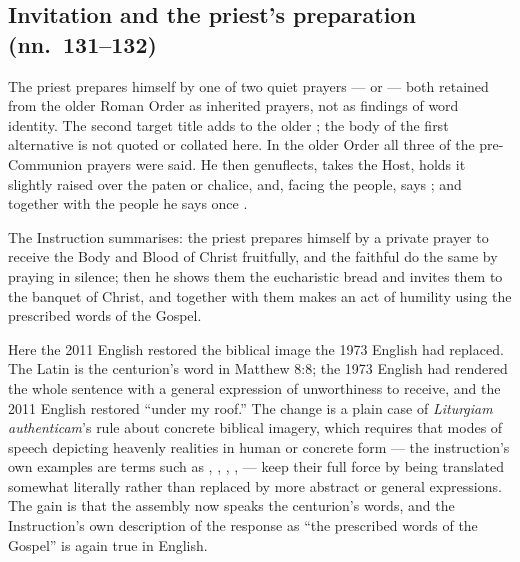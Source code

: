 \subsection{Invitation and the priest's preparation (nn.\ 131--132)}

The priest prepares himself by one of two quiet prayers ---  or  --- both retained from the older Roman
Order as inherited prayers, not as findings of word identity. The second target title adds
 to the older ; the body of the first
alternative is not quoted or collated here. In the older Order all three of the pre-Communion
prayers were said. He then genuflects, takes the
Host, holds it slightly raised over the paten or chalice, and, facing the people, says
; and
together with the people he says once .

The Instruction summarises: the priest prepares himself by a private prayer to receive the Body
and Blood of Christ fruitfully, and the faithful do the same by praying in silence; then he
shows them the eucharistic bread and invites them to the banquet of Christ, and together with
them makes an act of humility using the prescribed words of the Gospel.

Here the 2011 English restored the biblical image the 1973 English had replaced. The Latin
 is the centurion's word in Matthew 8:8; the 1973 English had
rendered the whole sentence with a general expression of unworthiness to receive, and the 2011
English restored ``under my roof.'' The change is a plain case of \emph{Liturgiam authenticam}'s
rule about concrete biblical imagery, which requires that modes of speech depicting heavenly
realities in human or concrete form --- the instruction's own examples are terms such as
, , , ,  --- keep their
full force by being translated somewhat literally rather than replaced by more abstract or
general expressions. The gain is that
the assembly now speaks the centurion's words, and the Instruction's own description of the
response as ``the prescribed words of the Gospel'' is again true in English.

